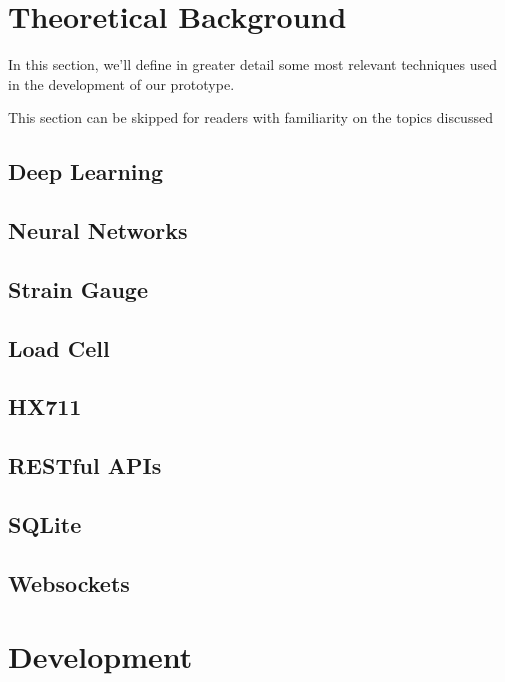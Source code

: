 \documentclass[openright]{normas-utf-tex} %
\begin{document}
\chapter{Theoretical Background}

In this section, we'll define in greater detail some most relevant techniques
used in the development of our prototype.

This section can be skipped for readers with familiarity on the topics discussed

\section{Deep Learning}

\section{Neural Networks}

\section{Strain Gauge}

\section{Load Cell}

\section{HX711}

\section{RESTful APIs}

\section{SQLite}

\section{Websockets}

\chapter{Development}
\label{chap:desenv}
\end{document}
